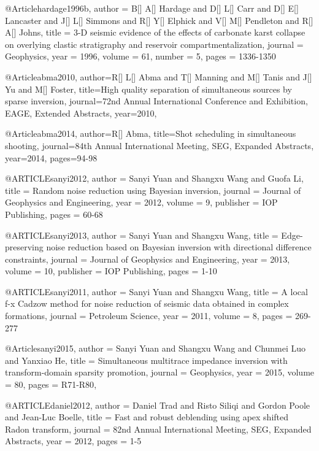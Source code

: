 {@Article{hardage1996b,
  author = 	 {B[] A[] Hardage and D[] L[] Carr and D[] E[] Lancaster and J[] L[] Simmons and R[] Y[] Elphick and V[] M[] Pendleton and R[] A[] Johns},
  title = 	 {3-D seismic evidence of the effects of carbonate karst collapse on overlying clastic stratigraphy and reservoir compartmentalization},
  journal = 	 {Geophysics},
  year = 	 1996,
  volume = 	 61,
  number = 	 5,
  pages = 	 {1336-1350}}
  
@Article{abma2010,
  author={R[] L[] Abma and T[] Manning and M[] Tanis and J[] Yu and M[] Foster},
  title={High quality separation of simultaneous sources by sparse inversion},
  journal={72nd Annual International Conference and Exhibition, EAGE, Extended Abstracts},
  year=2010,
}

@Article{abma2014,
  author={R[] Abma},
  title={Shot scheduling in simultaneous shooting},
  journal={84th Annual International Meeting, SEG, Expanded Abstracts},
  year=2014,
  pages={94-98}
}

@ARTICLE{sanyi2012,
  author = {Sanyi Yuan and Shangxu Wang and Guofa Li},
  title = {Random noise reduction using Bayesian inversion},
  journal = {Journal of Geophysics and Engineering},
  year = {2012},
  volume = {9},
  publisher = {IOP Publishing},
  pages = {60-68}
}

@ARTICLE{sanyi2013,
  author = {Sanyi Yuan and Shangxu Wang},
  title = {Edge-preserving noise reduction based on Bayesian inversion with directional difference constraints},
  journal = {Journal of Geophysics and Engineering},
  year = {2013},
  volume = {10},
  publisher = {IOP Publishing},
  pages = {1-10}
}

@ARTICLE{sanyi2011,
  author = {Sanyi Yuan and Shangxu Wang},
  title = {A local f-x Cadzow method for noise reduction of seismic data obtained in complex formations},
  journal = {Petroleum Science},
  year = {2011},
  volume = {8},
  pages = {269-277}
}

@Article{sanyi2015,
  author = 	 {Sanyi Yuan and Shangxu Wang and Chunmei Luo and Yanxiao He},
  title = 	 {Simultaneous multitrace impedance inversion with transform-domain sparsity promotion},
  journal = 	 {Geophysics},
  year = 	 2015,
  volume =	 80,
  pages =	 {R71-R80},
}

@ARTICLE{daniel2012,
  author = {Daniel Trad and Risto Siliqi and Gordon Poole and Jean-Luc Boelle},
  title = {Fast and robust deblending using apex shifted Radon transform},
  journal = {82nd Annual International Meeting, SEG, Expanded Abstracts},
  year = {2012},
  pages = {1-5}
}

}
